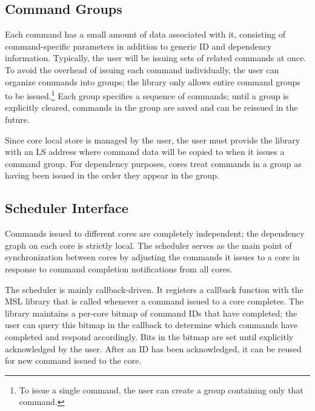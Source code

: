 \subsection{Command Groups}

Each command has a small amount of data associated with it, consisting
of command-specific parameters in addition to generic ID and
dependency information. Typically, the user will be issuing sets of
related commands at once. To avoid the overhead of issuing each
command individually, the user can organize commands into groups; the
library only allows entire command groups to be issued.\footnote{To
issue a single command, the user can create a group containing only
that command.} Each group specifies a sequence of commands; until a
group is explicitly cleared, commands in the group are saved and can
be reissued in the future.

Since core local store is managed by the user, the user must provide
the library with an LS address where command data will be copied to
when it issues a command group. For dependency purposes, cores treat
commands in a group as having been issued in the order they appear in
the group. 

\subsection{Scheduler Interface}

Commands issued to different cores are completely independent; the
dependency graph on each core is strictly local. The scheduler serves
as the main point of synchronization between cores by adjusting the
commands it issues to a core in response to command completion
notifications from all cores.

The scheduler is mainly callback-driven. It registers a callback
function with the MSL library that is called whenever a command issued
to a core completes. The library maintains a per-core bitmap of
command IDs that have completed; the user can query this bitmap in the
callback to determine which commands have completed and respond
accordingly. Bits in the bitmap are set until explicitly acknowledged
by the user. After an ID has been acknowledged, it can be reused for
new command issued to the core.



